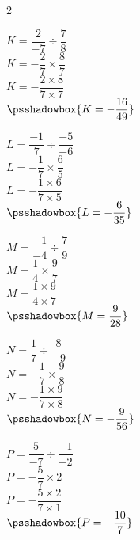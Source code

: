 \begin{corrige}
    \phantom{rrr}    
    \begin{multicols}2
        \begin{list}{}{}
            \begin{spacing}{2}
                \item $K=\dfrac{2}{-7}\div\dfrac{7}{8}$\\
                $K=-\dfrac{2}{7}\times\dfrac{8}{7}$\\
                $K=-\dfrac{2\times8}{7\times7}$\\
                $\psshadowbox{K=-\dfrac{16}{49}}$
                \item $L=\dfrac{-1}{7}\div\dfrac{-5}{-6}$\\
                $L=-\dfrac{1}{7}\times\dfrac{6}{5}$\\
                $L=-\dfrac{1\times6}{7\times5}$\\
                $\psshadowbox{L=-\dfrac{6}{35}}$
                \item $M=\dfrac{-1}{-4}\div\dfrac{7}{9}$\\
                $M=\dfrac{1}{4}\times\dfrac{9}{7}$\\
                $M=\dfrac{1\times9}{4\times7}$\\
                $\psshadowbox{M=\dfrac{9}{28}}$
                \columnbreak
                \item $N=\dfrac{1}{7}\div\dfrac{8}{-9}$\\
                $N=-\dfrac{1}{7}\times\dfrac{9}{8}$\\
                $N=-\dfrac{1\times9}{7\times8}$\\
                $\psshadowbox{N=-\dfrac{9}{56}}$
                \item $P=\dfrac{5}{-7}\div\dfrac{-1}{-2}$\\
                $P=-\dfrac{5}{7}\times2$\\
                $P=-\dfrac{5\times2}{7\times1}$\\
                $\psshadowbox{P=-\dfrac{10}{7}}$
            \end{spacing}
        \end{list}
    \end{multicols}
\end{corrige}

